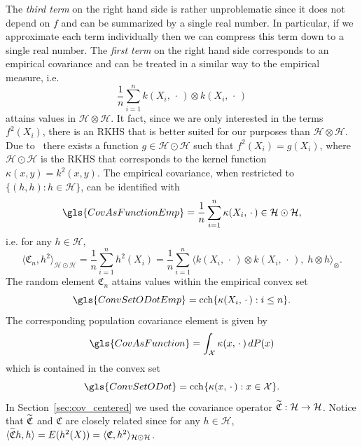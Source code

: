 \documentclass[10pt]{amsart}
\theoremstyle{definition}\newtheorem{defi}[theo]{Definition}\newtheorem{rema}[theo]{Remark}\newtheorem{exam}[theo]{Example}\newtheorem{exem}[theo]{Example}\newtheorem{nota}[theo]{Notation}
\theoremstyle{remark}
\DeclareMathOperator{\cch}{cch}
\newcommand{\X}{\mathcal{X}}
\newcommand{\cH}{\mathcal{H}}
\newcommand{\fkC}{\mathfrak{C}}
\newcommand{\Cov}{\tilde{\fkC}}
\let\oldtilde\tilde
\renewcommand*{\tilde}[1]{\mathchoice{\widetilde{#1}}{\widetilde{#1}}{\oldtilde{#1}}{\oldtilde{#1}}}
\renewcommand*{\to}{\mathchoice{\longrightarrow}{\rightarrow}{\rightarrow}{\rightarrow}}
\begin{document}
The \emph{third term} on the right hand side is rather unproblematic since it does not depend on $f$ and can be summarized by a single real number. In particular, if we approximate each term individually then we can compress this term down to a single real number. The
\emph{first term} on the right hand side corresponds to an empirical covariance and can be treated in a similar way to the empirical measure, i.e.
\[
\frac{1}{n} \sum_{i=1}^n k(X_i,\,\cdot\,) \otimes k(X_i,\,\cdot\,)
\]
attains values in $\cH \otimes \cH$. It fact, since we are only interested in the terms $f^2(X_i)$, there is an RKHS that is better suited for our purposes than $\cH \otimes \cH$. Due to~\cite[Theorem~5.16]{PAUL16} there exists a function $g\in \cH \odot \cH$ such that $f^2(X_i) = g(X_i)$, where $\cH\odot \cH$ is the RKHS that corresponds to the kernel function $\kappa(x,y) = k^2(x,y)$. The empirical covariance, when restricted to $\{ (h,h) : h \in \cH \}$, can be identified with
\[
\gls{CovAsFunctionEmp}= \frac{1}{n} \sum_{i=1}^n \kappa(X_i,\,\cdot\,) \in \cH \odot \cH,
\]
i.e. for any $h \in \cH$,
\[
\langle \fkC_n, h^2 \rangle_{\cH \odot \cH} = \frac{1}{n} \sum_{i=1}^n h^2(X_i) = \frac{1}{n} \sum_{i=1}^n \bigl\langle k(X_i,\,\cdot\,) \otimes k(X_i, \,\cdot\,),\; h\otimes h \bigr\rangle_{\otimes}.
\]
The random element $\fkC_n$ attains values within the empirical convex set
\[
\gls{ConvSetODotEmp} = \cch \{\kappa(X_i,\,\cdot\,) : i \leq n\}.
\]
The corresponding population covariance element is given by
\begin{equation}\label{eq:cov_as_mean_emb}
\gls{CovAsFunction} = \int_{\X} \kappa(x,\,\cdot\,) \, dP(x)
\end{equation}
which is contained in the convex set
\[
\gls{ConvSetODot}= \cch \{ \kappa(x,\,\cdot\,) : x\in \X \}.
\]
In Section~\ref {sec:cov_centered} we used the covariance operator $\Cov:\cH \to \cH$. Notice that $\Cov$ and $\fkC$ are closely related since for any $h\in \cH$, $\langle \Cov h,h \rangle = E(h^2(X)) = \langle \fkC, h^2 \rangle_{\cH \odot \cH}$.
\end{document}
